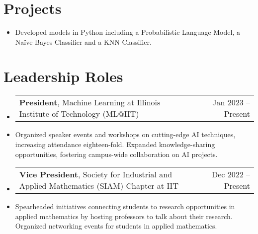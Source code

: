 \documentclass[letterpaper,10pt]{article}
\makeatletter
\newcommand\indentsize{10pt}
\newcommand{\resumeItem}[1]{
  \item\small{
    {#1 \vspace{-2pt}}
  }
}
\newcommand{\resumeSubSubheading}[2]{
    \item \normalsize
    \begin{tabular*}{0.97\textwidth}{l@{\extracolsep{\fill}}r}
      #1 & #2 \\
    \end{tabular*}\vspace{-7pt}
}
\newcommand{\resumeSubHeadingListStart}{\begin{itemize}[leftmargin=0.15in, label=]}
\newcommand{\resumeSubHeadingListEnd}{\end{itemize}}
\newcommand{\resumeItemListStart}{\begin{itemize}[leftmargin=\indentsize, label=-]\vspace{-7pt}}
\newcommand{\resumeItemListEnd}{\end{itemize}\vspace{-5pt}}
\makeatother
\begin{document}
\section{Projects}
\resumeSubHeadingListStart
        \resumeItemListStart
            \resumeItem{Developed models in Python including a Probabilistic Language Model, a Na\"{i}ve Bayes Classifier and a KNN Classifier.}
        \resumeItemListEnd
\resumeSubHeadingListEnd


\section{Leadership Roles}
\resumeSubHeadingListStart
    \resumeSubSubheading{\textbf{President}, Machine Learning at Illinois Institute of Technology (ML@IIT)}{Jan 2023 -- Present}
    \resumeItem{Organized speaker events and workshops on cutting-edge AI techniques, increasing attendance eighteen-fold. Expanded knowledge-sharing opportunities, fostering campus-wide collaboration on AI projects.}
    \resumeSubSubheading{\textbf{Vice President}, Society for Industrial and Applied Mathematics (SIAM) Chapter at IIT}{Dec 2022 -- Present}
    \resumeItem{Spearheaded initiatives connecting students to research opportunities in applied mathematics by hosting professors to talk about their research. Organized networking events for students in applied mathematics.}
\resumeSubHeadingListEnd
\end{document}
